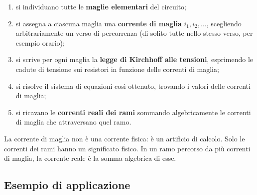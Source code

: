 \begin{enumerate}[leftmargin=1cm]
  \item si individuano tutte le \textbf{maglie elementari} del circuito;
  \item si assegna a ciascuna maglia una \textbf{corrente di maglia} \(i_1, i_2, \dots\), scegliendo arbitrariamente un verso di percorrenza (di solito tutte nello stesso verso, per esempio orario);
  \item si scrive per ogni maglia la \textbf{legge di Kirchhoff alle tensioni}, esprimendo le cadute di tensione sui resistori in funzione delle correnti di maglia;
  \item si risolve il sistema di equazioni così ottenuto, trovando i valori delle correnti di maglia;
  \item si ricavano le \textbf{correnti reali dei rami} sommando algebricamente le correnti di maglia che attraversano quel ramo.
\end{enumerate}

\begin{attenzione}
La corrente di maglia non è una corrente fisica: è un artificio di calcolo. Solo le correnti dei rami hanno un significato fisico. In un ramo percorso da più correnti di maglia, la corrente reale è la somma algebrica di esse.
\end{attenzione}

\subsection{Esempio di applicazione}

